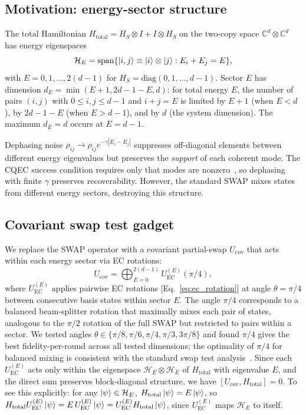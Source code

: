 \documentclass[prx,twocolumn,superscriptaddress,longbibliography,floatfix]{revtex4-2}
\begin{document}
\subsection{Motivation: energy-sector structure}
\label{sec:motivation}

The total Hamiltonian $H_\mathrm{total} = H_S \otimes I + I \otimes H_S$ on the two-copy space $\mathbb{C}^d \otimes \mathbb{C}^d$ has energy eigenspaces
\begin{equation}
\mathcal{H}_E = \mathrm{span}\{\ket{i,j} \equiv \ket{i}\otimes\ket{j} : E_i + E_j = E\},
\label{eq:energy_sectors}
\end{equation}
with $E = 0, 1, \ldots, 2(d-1)$ for $H_S = \mathrm{diag}(0, 1, \ldots, d-1)$.
Sector $E$ has dimension $d_E = \min(E+1, 2d-1-E, d)$: for total energy $E$, the number of pairs $(i,j)$ with $0 \leq i,j \leq d-1$ and $i + j = E$ is limited by $E+1$ (when $E < d$), by $2d-1-E$ (when $E > d-1$), and by $d$ (the system dimension). The maximum $d_E = d$ occurs at $E = d-1$.

Dephasing noise $\rho_{ij} \to \rho_{ij} e^{-\gamma|E_i - E_j|}$ suppresses off-diagonal elements between different energy eigenvalues but preserves the \emph{support} of each coherent mode.
The CQEC success condition requires only that modes are nonzero~\cite{Wakaura2026}, so dephasing with finite $\gamma$ preserves recoverability.
However, the standard SWAP mixes states from different energy sectors, destroying this structure.

\subsection{Covariant swap test gadget}
\label{sec:cov_gadget}

We replace the SWAP operator with a covariant partial-swap $U_\mathrm{cov}$ that acts within each energy sector via EC rotations:
\begin{equation}
U_\mathrm{cov} = \bigoplus_{E=0}^{2(d-1)} U_\mathrm{EC}^{(E)}(\pi/4),
\label{eq:u_cov}
\end{equation}
where $U_\mathrm{EC}^{(E)}$ applies pairwise EC rotations [Eq.~\eqref{eq:ec_rotation}] at angle $\theta = \pi/4$ between consecutive basis states within sector $E$.
The angle $\pi/4$ corresponds to a balanced beam-splitter rotation that maximally mixes each pair of states, analogous to the $\pi/2$ rotation of the full SWAP but restricted to pairs within a sector.
We tested angles $\theta \in \{\pi/8, \pi/6, \pi/4, \pi/3, 3\pi/8\}$ and found $\pi/4$ gives the best fidelity-per-round across all tested dimensions; the optimality of $\pi/4$ for balanced mixing is consistent with the standard swap test analysis~\cite{Childs2025}.
Since each $U_\mathrm{EC}^{(E)}$ acts only within the eigenspace $\mathcal{H}_E \otimes \mathcal{H}_E$ of $H_\mathrm{total}$ with eigenvalue $E$, and the direct sum preserves block-diagonal structure, we have $[U_\mathrm{cov}, H_\mathrm{total}] = 0$.
To see this explicitly: for any $\ket{\psi} \in \mathcal{H}_E$, $H_\mathrm{total}\ket{\psi} = E\ket{\psi}$, so $H_\mathrm{total} U_\mathrm{EC}^{(E)}\ket{\psi} = E\, U_\mathrm{EC}^{(E)}\ket{\psi} = U_\mathrm{EC}^{(E)} H_\mathrm{total}\ket{\psi}$, since $U_\mathrm{EC}^{(E)}$ maps $\mathcal{H}_E$ to itself.
\end{document}
